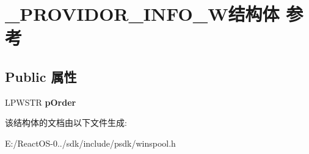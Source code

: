\hypertarget{struct___p_r_o_v_i_d_o_r___i_n_f_o__2_w}{}\section{\+\_\+\+P\+R\+O\+V\+I\+D\+O\+R\+\_\+\+I\+N\+F\+O\+\_\+W结构体 参考}
\label{struct___p_r_o_v_i_d_o_r___i_n_f_o__2_w}
\subsection*{Public 属性}
\begin{DoxyCompactItemize}
\item 
\mbox{\label{struct___p_r_o_v_i_d_o_r___i_n_f_o__2_w_a743b50520f677cd3c1ad5da225f7b753}} 
L\+P\+W\+S\+TR {\bfseries p\+Order}
\end{DoxyCompactItemize}


该结构体的文档由以下文件生成\+:\begin{DoxyCompactItemize}
\item 
E\+:/\+React\+O\+S-\/0../sdk/include/psdk/winspool.\+h\end{DoxyCompactItemize}
